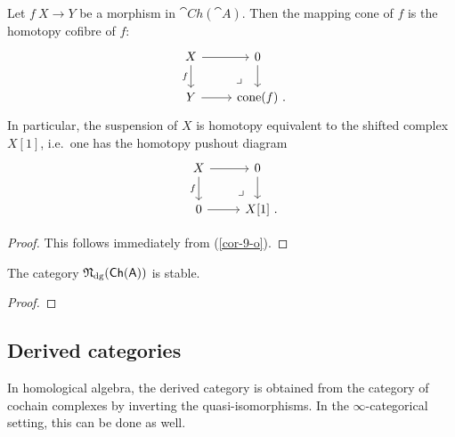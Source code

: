 \begin{proposition}
    Let $f\:X\to Y$ be a morphism in $\cat{Ch}(\cat{A})$.
    Then the mapping cone of $f$ is the homotopy cofibre of $f$:
    \[\begin{tikzcd}
        X\ar[r]\ar[d,"f"']\ar[dr,phantom,pos=.75,"\lrcorner",end anchor={[xshift=-.5em]north}] & 0\ar[d] \\
        Y\ar[r] & \operatorname{cone}(f)\rlap{\ .}
    \end{tikzcd}\]
    In particular, the suspension of $X$ is homotopy equivalent to
    the shifted complex $X[1]$,
    i.e.\ one has the homotopy pushout diagram
    \[\begin{tikzcd}
        X\ar[r]\ar[d,"f"']\ar[dr,phantom,pos=.75,"\lrcorner",end anchor={[xshift=-.5em]north}] & 0\ar[d] \\
        0\ar[r] & X[1]\rlap{\ .}
    \end{tikzcd}\]
\end{proposition}

\begin{proof}
    This follows immediately from (\ref{cor-9-o}).
\end{proof}

\begin{theorem}
    The category $\mathfrak{N}_{\mathrm{dg}}(\mathsf{Ch}(\mathsf{A}))$ is stable.
\end{theorem}

\begin{proof}
    \nyw
\end{proof}

\subsection{Derived categories}

In homological algebra, the derived category 
is obtained from the category of cochain complexes
by inverting the quasi-isomorphisms.
In the $\infty$-categorical setting, this can be done as well.

\nyw 
